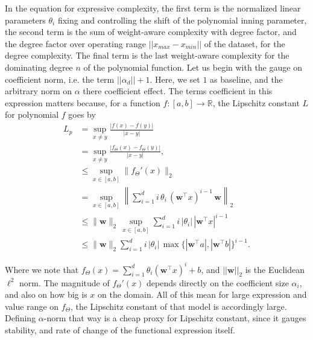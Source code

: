 \documentclass[
  journal=largetwo,
  year=2025,
  volume=37,
]{cup-journal}
\begin{document}
In the equation for expressive complexity, the first term is the normalized linear parameters $\theta_{i}$ fixing and controlling the shift of the polynomial inning parameter, the second term is the sum of weight-aware complexity with degree factor, and the degree factor over operating range $||x_{max}-x_{min}||$ of the dataset, for the degree complexity. The final term is the last weight-aware complexity for the dominating degree $n$ of the polynomial function. Let us begin with the gauge on coefficient norm, i.e. the term $||\alpha_{d}||+1$. Here, we set $1$ as baseline, and the arbitrary norm on $\alpha$ there coefficient effect. The terms coefficient in this expression matters because, for a function $f:[a,b]\to\mathbb{R}$, the Lipschitz constant $L$ for polynomial $f$ goes by 
\begin{equation}
\begin{split}
L_{p} 
&= \sup_{x\neq y}\frac{|f(x)-f(y)|}{|x-y|} \\
&= \sup_{x\neq y}\frac{|f_{\Theta}(x)-f_{\Theta}(y)|}{|x-y|}, \\
&\leq \sup_{x \in [a,b]} \| f_{\Theta}'(x) \|_2 \\
&= \sup_{x \in [a,b]} \left\| \sum_{i=1}^{d} i \, \theta_i \, (\mathbf{w}^\top x)^{i-1} \, \mathbf{w} \right\|_2 \\
&\le \|\mathbf{w}\|_2 \, \sup_{x \in [a,b]} \sum_{i=1}^{d} i \, |\theta_i| \, |\mathbf{w}^\top x|^{i-1} \\
&\le \|\mathbf{w}\|_2 \sum_{i=1}^{d} i \, |\theta_i| \, \max \{ |\mathbf{w}^\top a|, |\mathbf{w}^\top b| \}^{i-1}.
\end{split}
\end{equation}

Where we note that $f_{\Theta}(x)=\sum_{i=1}^{d} \theta_i \left( \mathbf{w}^\top x \right)^i + b$, and $||\mathbf{w}||_{2}$ is the Euclidean $\ell^{2}$ norm. The magnitude of $f_{\Theta}'(x)$ depends directly on the coefficient size $\alpha_{i}$, and also on how big is $x$ on the domain. All of this mean for large expression and value range on $f_{\Theta}$, the Lipschitz constant of that model is accordingly large. Defining $\alpha$-norm that way is a cheap proxy for Lipschitz constant, since it gauges stability, and rate of change of the functional expression itself. 
\end{document}
